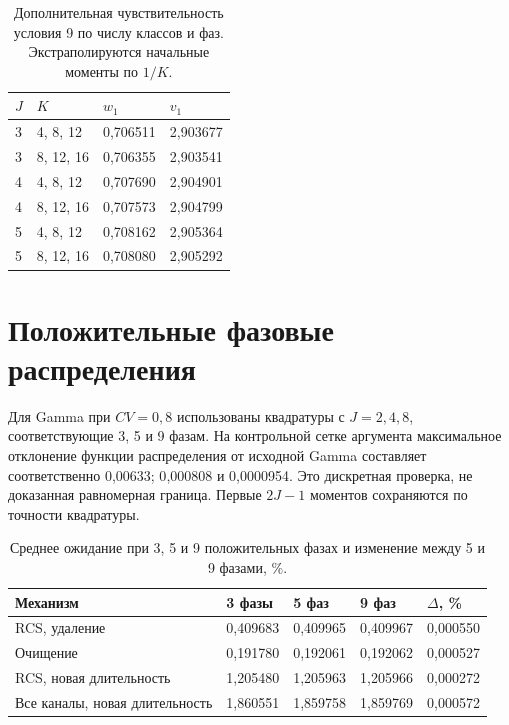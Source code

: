 \documentclass[a4paper,12pt]{article}
\begin{document}
\begin{table}[!htbp]
\centering\small\setlength{\tabcolsep}{2pt}
\begin{tabular}{@{}p{1.42cm}p{4.72cm}p{4.72cm}p{4.72cm}@{}}
\toprule
$J$ & $K$ & $w_1$ & $v_1$ \\
\midrule
3 & 4, 8, 12 & 0,706511 & 2,903677 \\
3 & 8, 12, 16 & 0,706355 & 2,903541 \\
4 & 4, 8, 12 & 0,707690 & 2,904901 \\
4 & 8, 12, 16 & 0,707573 & 2,904799 \\
5 & 4, 8, 12 & 0,708162 & 2,905364 \\
5 & 8, 12, 16 & 0,708080 & 2,905292 \\
\bottomrule
\end{tabular}
\caption{Дополнительная чувствительность условия 9 по числу классов и фаз. Экстраполируются начальные моменты по \(1/K\).}
\label{tab:case09}
\end{table}



\section{Положительные фазовые распределения}
Для Gamma при \(CV=0{,}8\) использованы квадратуры с \(J=2,4,8\), соответствующие 3, 5 и 9 фазам. На контрольной сетке аргумента максимальное отклонение функции распределения от исходной Gamma составляет соответственно 0{,}00633; 0{,}000808 и 0{,}0000954. Это дискретная проверка, не доказанная равномерная граница. Первые \(2J-1\) моментов сохраняются по точности квадратуры.

\begin{table}[!htbp]
\centering\small\setlength{\tabcolsep}{2pt}
\begin{tabular}{@{}p{5.76cm}p{2.55cm}p{2.55cm}p{2.55cm}p{2.17cm}@{}}
\toprule
Механизм & 3 фазы & 5 фаз & 9 фаз & $\Delta$, \% \\
\midrule
RCS, удаление & 0,409683 & 0,409965 & 0,409967 & 0,000550 \\
Очищение & 0,191780 & 0,192061 & 0,192062 & 0,000527 \\
RCS, новая длительность & 1,205480 & 1,205963 & 1,205966 & 0,000272 \\
Все каналы, новая длительность & 1,860551 & 1,859758 & 1,859769 & 0,000572 \\
\bottomrule
\end{tabular}
\caption{Среднее ожидание при 3, 5 и 9 положительных фазах и изменение между 5 и 9 фазами, \%.}
\label{tab:ph}
\end{table}
\end{document}
